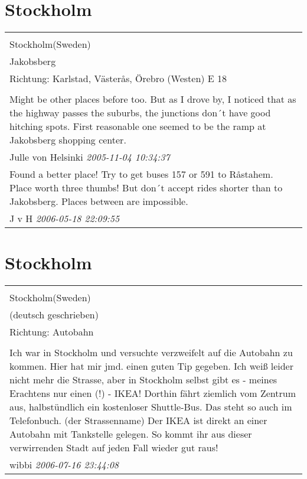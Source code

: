 \documentclass[a4paper,12pt]{article}
\begin{document}
\section{Stockholm}
\begin{tabular}{|p{13cm}|}
\hline\\
Stockholm(Sweden)\\
Jakobsberg\\
Richtung: Karlstad, Västerås, Örebro (Westen) E 18 \\
\hline\\
Might be other places before too. But as I drove by, I noticed that as the highway passes the suburbs, the junctions don´t have good hitching spots. First reasonable one seemed to be the ramp at Jakobsberg shopping center. \\
Julle von Helsinki \textit{ 2005-11-04 10:34:37 }\\\hline Found a better place! Try to get buses 157 or 591 to Råstahem. Place worth three thumbs! But don´t accept rides shorter than to Jakobsberg. Places between are impossible. \\
J v H \textit{ 2006-05-18 22:09:55 }\\\hline
\end{tabular}


\section{Stockholm}
\begin{tabular}{|p{13cm}|}
\hline\\
Stockholm(Sweden)\\
(deutsch geschrieben)\\
Richtung: Autobahn \\
\hline\\
Ich war in Stockholm und versuchte verzweifelt auf die Autobahn zu kommen. Hier hat mir jmd. einen guten Tip gegeben. Ich weiß leider nicht mehr die Strasse, aber in Stockholm selbst gibt es - meines Erachtens nur einen (!) - IKEA! Dorthin fährt ziemlich vom Zentrum aus, halbstündlich ein kostenloser Shuttle-Bus. Das steht so auch im Telefonbuch. (der Strassenname) Der IKEA ist direkt an einer Autobahn mit Tankstelle gelegen. So kommt ihr aus dieser verwirrenden Stadt auf jeden Fall wieder gut raus! \\
wibbi \textit{ 2006-07-16 23:44:08 }\\\hline
\end{tabular}
\end{document}
